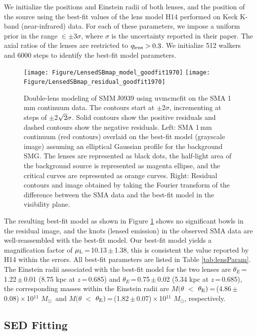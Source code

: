 \documentclass[twocolumn,apj,numberedappendix]{emulateapj}
\newcommand{\Msun}{\mbox{$M_{\odot}$}}
\begin{document}
We initialize the positions and Einstein radii of both lenses, and the position of the source using the
best-fit values of the lens model H14 performed on Keck K-band (near-infrared) data. For each of
these parameters, we impose a uniform prior in the range $\in\pm$3$\sigma$, where $\sigma$ is the uncertainty
reported in their paper. The axial ratios of the lenses are restricted to $q_{\rm lens} > 0.3$. We initialize 512
walkers and 6000 steps to identify the best-fit model parameters.
\begin{figure}[!tbpH]
\centering
\texttt{[image: Figure/LensedSBmap\_model\_goodfit1970]}
\texttt{[image: Figure/LensedSBmap\_residual\_goodfit1970]}
\caption{Double-lens modeling of SMM\,J0939 using {\sc uvmcmcfit} on the SMA 1\,mm continuum data.
The contours start at $\pm$2$\sigma$, incrementing at
steps of $\pm$2$\sqrt{\rm 2}\sigma$. Solid contours show the positive residuals and dashed contours
show the negative residuals. 
Left: SMA 1\,mm continuum (red contours) overlaid on the best-fit model (grayscale image) assuming an elliptical Gaussian profile for the background SMG. The lenses are represented as black dots, the half-light area of the background source is represented as magenta ellipse, and the critical curves are represented as orange curves. 
Right: Residual contours and image obtained by taking the Fourier transform of the difference between the SMA data and the best-fit model in the visibility plane. \label{fig:lens}}
\end{figure}

The resulting best-fit model as shown in Figure\,\,\ref{fig:lens} shows no significant bowls in the residual
image, and the knots (lensed emission) in the observed SMA data are well-reassembled with the best-fit model.
Our best-fit model yields a magnification
factor of $\mu_{\rm L}$\,=\,10.13\,$\pm$\,1.38, this is consistent the value reported by H14 within the errors. All best-fit
parameters are listed in Table \ref{tab:lensParam}. The Einstein radii associated with the best-fit model for the two lenses are $\theta_{E}$\,=\,1.22\,$\pm$\,0.01 (8.75 kpc at $z$\,=\,0.685) and $\theta_{E}$\,=\,0.75\,$\pm$\,0.02 (5.34 kpc at $z$\,=\,0.685),
the corresponding masses within the Einstein radii are $M(\theta$\,\,$<$\,\,$\theta_{\rm E})$\,=\,(4.86\,$\pm$\,0.08)\,$\times$\,10$^{11}$\,\,\Msun\ and $M(\theta$\,\,$<$\,\,$\theta_{\rm E})$\,=\,(1.82\,$\pm$\,0.07)\,$\times$\,10$^{11}$\,\,\Msun, respectively. 


\subsection{SED Fitting} \label{sec:SED}
\end{document}
